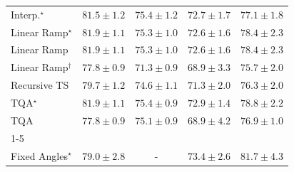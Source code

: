 \begin{tabular}{l|cccc|}
Interp.$^\star$ & {\cellcolor[HTML]{004D2C}} \color[HTML]{F1F1F1} $81.5\pm 1.2$ & {\cellcolor[HTML]{4FB264}} \color[HTML]{F1F1F1} $75.4\pm 1.2$ & {\cellcolor[HTML]{97D385}} \color[HTML]{000000} $72.7\pm 1.7$ & {\cellcolor[HTML]{2F944E}} \color[HTML]{F1F1F1} $77.1\pm 1.8$ \\
Linear Ramp$^\star$ & {\cellcolor[HTML]{004629}} \color[HTML]{F1F1F1} $81.9\pm 1.1$ & {\cellcolor[HTML]{51B365}} \color[HTML]{F1F1F1} $75.3\pm 1.0$ & {\cellcolor[HTML]{9AD587}} \color[HTML]{000000} $72.6\pm 1.6$ & {\cellcolor[HTML]{1A7D40}} \color[HTML]{F1F1F1} $78.4\pm 2.3$ \\
Linear Ramp & {\cellcolor[HTML]{004629}} \color[HTML]{F1F1F1} $81.9\pm 1.1$ & {\cellcolor[HTML]{51B365}} \color[HTML]{F1F1F1} $75.3\pm 1.0$ & {\cellcolor[HTML]{9AD587}} \color[HTML]{000000} $72.6\pm 1.6$ & {\cellcolor[HTML]{1A7D40}} \color[HTML]{F1F1F1} $78.4\pm 2.3$ \\
Linear Ramp$^\dagger$ & {\cellcolor[HTML]{258745}} \color[HTML]{F1F1F1} $77.8\pm 0.9$ & {\cellcolor[HTML]{BAE394}} \color[HTML]{000000} $71.3\pm 0.9$ & {\cellcolor[HTML]{E8F6AE}} \color[HTML]{000000} $68.9\pm 3.3$ & {\cellcolor[HTML]{47AE60}} \color[HTML]{F1F1F1} $75.7\pm 2.0$ \\
Recursive TS & {\cellcolor[HTML]{056C39}} \color[HTML]{F1F1F1} $79.7\pm 1.2$ & {\cellcolor[HTML]{64BC6F}} \color[HTML]{F1F1F1} $74.6\pm 1.1$ & {\cellcolor[HTML]{BAE394}} \color[HTML]{000000} $71.3\pm 2.0$ & {\cellcolor[HTML]{3CA458}} \color[HTML]{F1F1F1} $76.3\pm 2.0$ \\
TQA$^\star$ & {\cellcolor[HTML]{004629}} \color[HTML]{F1F1F1} $81.9\pm 1.1$ & {\cellcolor[HTML]{4FB264}} \color[HTML]{F1F1F1} $75.4\pm 0.9$ & {\cellcolor[HTML]{92D183}} \color[HTML]{000000} $72.9\pm 1.4$ & {\cellcolor[HTML]{14783E}} \color[HTML]{F1F1F1} $78.8\pm 2.2$ \\
TQA & {\cellcolor[HTML]{258745}} \color[HTML]{F1F1F1} $77.8\pm 0.9$ & {\cellcolor[HTML]{58B669}} \color[HTML]{F1F1F1} $75.1\pm 0.9$ & {\cellcolor[HTML]{E8F6AE}} \color[HTML]{000000} $68.9\pm 4.2$ & {\cellcolor[HTML]{329850}} \color[HTML]{F1F1F1} $76.9\pm 1.0$ \\
\cline{1-5}
\multicolumn{5}{c}{\rule{0pt}{8pt}SV} \\
\midrule
Fixed Angles$^\star$ & {\cellcolor[HTML]{04649E}} \color[HTML]{F1F1F1} $79.0\pm 2.8$ & {\cellcolor[HTML]{000000}} \color[HTML]{F1F1F1} {\cellcolor{white}} \color{black} - & {\cellcolor[HTML]{80AED2}} \color[HTML]{F1F1F1} $73.4\pm 2.6$ & {\cellcolor[HTML]{023C5F}} \color[HTML]{F1F1F1} $81.7\pm 4.3$ \\

\end{tabular}
